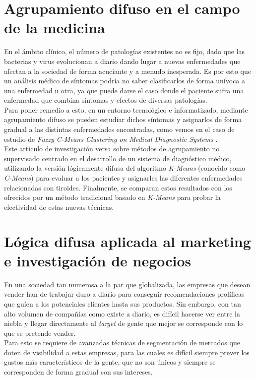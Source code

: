 \documentclass[]{report}
\begin{document}
		\section{Agrupamiento difuso en el campo de la medicina}
		
			En el ámbito clínico, el número de patologías existentes no es fijo, dado que las bacterias y virus evolucionan a diario dando lugar a nuevas enfermedades que afectan a la sociedad de forma acuciante y a menudo inesperada. Es por esto que un análisis médico de síntomas podría no saber clasificarlos de forma unívoca a una enfermedad u otra, ya que puede darse el caso donde el paciente sufra una enfermedad que combina síntomas y efectos de diversas patologías.\\
			
			Para poner remedio a esto, en un entorno tecnológico e informatizado, mediante agrupamiento difuso se pueden estudiar dichos síntomas y asignarlos de forma gradual a las distintas enfermedades encontradas, como vemos en el caso de estudio de \textit{Fuzzy C-Means Clustering on Medical Diagnostic Systems} \cite{medicine}.\\
			
			Este artículo de investigación versa sobre métodos de agrupamiento no supervisado centrado en el desarrollo de un sistema de diagnóstico médico, utilizando la versión lógicamente difusa del algoritmo \textit{K-Means} (conocido como \textit{C-Means}) para evaluar a los pacientes y asignarles las diferentes enfermedades relacionadas con tiroides. Finalmente, se comparan estos resultados con los ofrecidos por un método tradicional basado en \textit{K-Means} para probar la efectividad de estas nuevas técnicas.
			
		\section{Lógica difusa aplicada al marketing e investigación de negocios}
		
			En una sociedad tan numerosa a la par que globalizada, las empresas que desean vender han de trabajar duro a diario para conseguir recomendaciones prolíficas que guíen a los potenciales clientes hasta sus productos. Sin embargo, con tan alto volumen de compañías como existe a diario, es difícil hacerse ver entre la niebla y llegar directamente al \textit{target} de gente que mejor se corresponde con lo que se pretende vender.\\
			
			Para esto se requiere de avanzadas técnicas de segmentación de mercados que doten de visibilidad a estas empresas, para las cuales es difícil siempre prever los gustos más característicos de la gente, que no son únicos y siempre se corresponden de forma gradual con sus intereses.\\
			
\end{document}

